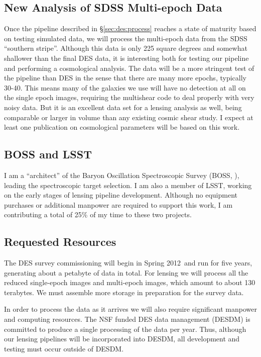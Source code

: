 \documentclass[12pt]{article}
\newcommand{\commissdate}{Spring 2012}
\begin{document}
\subsection{New Analysis of SDSS Multi-epoch Data} \label{sec:sdssnew}

Once the pipeline described in \S \ref{sec:des:process} reaches a state of
maturity based on testing simulated data, we will process the multi-epoch data
from the SDSS ``southern stripe''.  Although this data is only 225 square
degrees and somewhat shallower than the final DES data, it is interesting both
for testing our pipeline and performing a cosmological analysis.  The data will
be a more stringent test of the pipeline than DES in the sense that there are
many more epochs, typically 30-40.  This means many of the galaxies we use will
have no detection at all on the single epoch images, requiring the multishear
code to deal properly with very noisy data.  But it is an excellent data set
for a lensing analysis as well, being comparable or larger in volume than any
existing cosmic shear study.  I expect at least one publication on cosmological
parameters will be based on this work.

\subsection{BOSS and LSST}

I am a ``architect'' of the Baryon Oscillation Spectroscopic Survey (BOSS,
\cite{BossWhitePaper}), leading the spectroscopic target selection.  I am also
a member of LSST, working on the early stages of lensing pipeline development.
Although no equipment purchases or additional manpower are required to support
this work, I am contributing a total of 25\% of my time to these two projects.

\subsection{Requested Resources}

The DES survey commissioning will begin in \commissdate\ and run for five years,
generating about a petabyte of data in total.  For lensing we will process all
the reduced single-epoch images and multi-epoch images, which amount to about
130 terabytes.  We must assemble more storage in preparation for the survey
data.

In order to process the data as it arrives we will also require significant
manpower and computing resources.  The NSF funded DES data management (DESDM)
is committed to produce a single processing of the data per year.  Thus,
although our lensing pipelines will be incorporated into DESDM, all development
and testing must occur outside of DESDM.  
\end{document}
